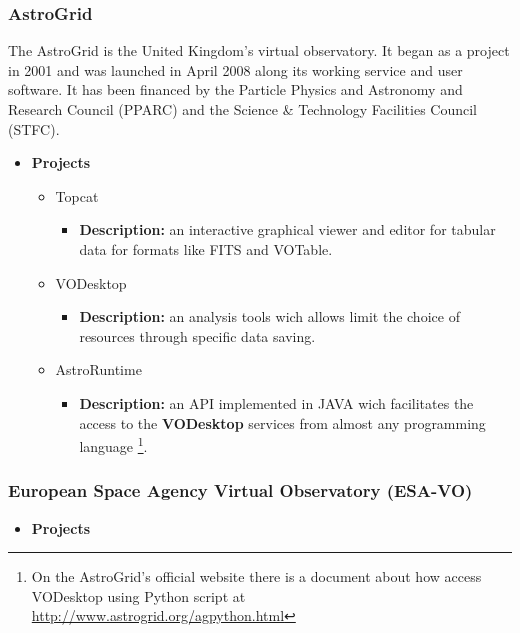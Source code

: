 \subsubsection{AstroGrid}
The AstroGrid is the United Kingdom's virtual observatory. It began as a project
in 2001 and was launched in April 2008 along its working service and user
software. It has been financed by the Particle Physics and Astronomy and
Research Council (PPARC) and the Science \& Technology Facilities Council
(STFC).

\begin{itemize}
\item \textbf{Projects}
\begin{itemize}
\item Topcat
\begin{itemize}
\item \textbf{Description:} an interactive graphical viewer and editor for
tabular data for formats like FITS and VOTable.
\end{itemize}
\item VODesktop
\begin{itemize}
\item \textbf{Description:} an analysis tools wich allows limit the choice of
resources through specific data saving.
\end{itemize}
\item AstroRuntime
\begin{itemize}
\item \textbf{Description:} an API implemented in JAVA wich facilitates the
access to the \textbf{VODesktop} services from almost any programming language
\footnote{On the AstroGrid's official website there is a document about how
access VODesktop using Python script at
\url{http://www.astrogrid.org/agpython.html}}.
\end{itemize}
\end{itemize}
\end{itemize}

\subsubsection{European Space Agency Virtual Observatory (ESA-VO)}
\begin{itemize}
\item \textbf{Projects}
\end{itemize}

